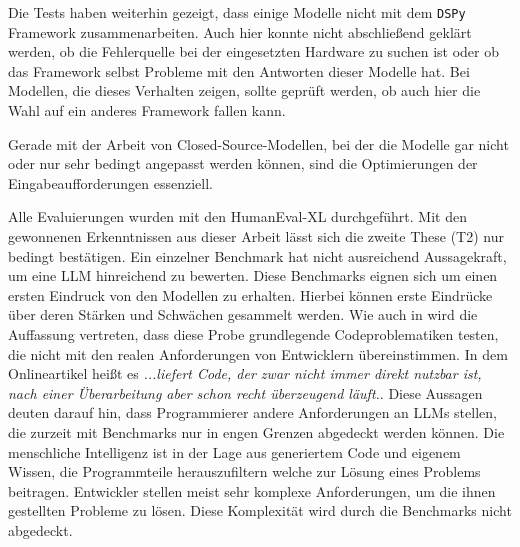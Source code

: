 Die Tests haben weiterhin gezeigt, dass einige Modelle nicht mit dem \texttt{DSPy} Framework zusammenarbeiten. Auch hier konnte nicht abschließend geklärt werden, ob die Fehlerquelle bei der eingesetzten Hardware zu suchen ist oder ob das Framework selbst Probleme mit den Antworten dieser Modelle hat. Bei Modellen, die dieses Verhalten zeigen, sollte geprüft werden, ob auch hier die Wahl auf ein anderes Framework fallen kann.\vspace{0.2cm}

Gerade mit der Arbeit von Closed-Source-Modellen, bei der die Modelle gar nicht oder nur sehr bedingt angepasst werden können, sind die Optimierungen der Eingabeaufforderungen essenziell.\vspace{0.2cm}

Alle Evaluierungen wurden mit den HumanEval-XL durchgeführt. Mit den gewonnenen Erkenntnissen aus dieser Arbeit lässt sich die zweite These (T2) nur bedingt bestätigen. Ein einzelner Benchmark hat nicht ausreichend Aussagekraft, um eine LLM hinreichend zu bewerten. Diese Benchmarks eignen sich um einen ersten Eindruck von den Modellen zu erhalten. Hierbei können erste Eindrücke über deren Stärken und Schwächen gesammelt werden. Wie auch in \cite{zhang-2024} wird die Auffassung vertreten, dass diese Probe grundlegende Codeproblematiken testen, die nicht mit den realen Anforderungen von Entwicklern übereinstimmen. In dem Onlineartikel \cite{albrecht-2023} heißt es \glqq \textit{...liefert Code, der zwar nicht immer direkt nutzbar ist, nach einer Überarbeitung aber schon recht überzeugend läuft.}\grqq. Diese Aussagen deuten darauf hin, dass Programmierer andere Anforderungen an LLMs stellen, die zurzeit mit Benchmarks nur in engen Grenzen abgedeckt werden können.
Die menschliche Intelligenz ist in der Lage aus generiertem Code und eigenem Wissen, die Programmteile herauszufiltern welche zur Lösung eines Problems beitragen. Entwickler stellen meist sehr komplexe Anforderungen, um die ihnen gestellten Probleme zu lösen. Diese Komplexität wird durch die Benchmarks nicht abgedeckt.\vspace{0.2cm}

